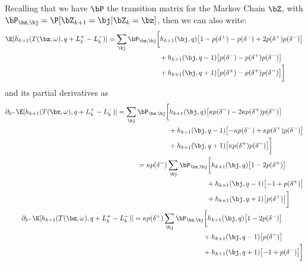 \documentclass[12pt]{article}
\begin{document}
Recalling that we have  $\bP$ the transition matrix for the Markov Chain $\bZ$, with $\bP_{\bz, \bj} = \P[\bZ_{k+1} = \bj | \bZ_k = \bz]$, then we can also write:
\begin{equation}
\begin{split}
\E[h_{k+1}(T(\bz,\omega), q + L_k^+ - L_k^- )] & = \sum_\bj \bP_{\bz,\bj} \biggl[ h_{k+1}(\bj, q) \bigl[ 1 - p(\delta^+) - p(\delta^-) + 2 p(\delta^+) p(\delta^-) \bigr]  \\
& \hphantom{\sum_\bj \bP_{\bz,\bj} \biggl[ {}+{}} + h_{k+1}(\bj, q-1) \bigl[ p(\delta^-)  - p(\delta^+) p(\delta^-) \bigr]   \\
& \hphantom{\sum_\bj \bP_{\bz,\bj} \biggl[ {}+{}} + h_{k+1}(\bj, q+1) \bigl[ p(\delta^+)  - p(\delta^+) p(\delta^-) \bigr] \biggr]
\end{split}
\end{equation}
and its partial derivatives as
\begin{align}
\begin{split}
\partial_{\delta^-} \E[h_{k+1}(T(\bz,\omega), q + L_k^+ - L_k^- )] & = 
\sum_\bj \bP_{\bz,\bj} \biggl[ h_{k+1}(\bj, q) \bigl[ \kappa p(\delta^-) - 2 \kappa p(\delta^+) p(\delta^-) \bigr]  \\
& \hphantom{\sum_\bj \bP_{\bz,\bj} \biggl[ {}+{}} + h_{k+1}(\bj, q-1) \bigl[ -\kappa p(\delta^-) + \kappa p(\delta^+) p(\delta^-) \bigr]   \\
& \hphantom{\sum_\bj \bP_{\bz,\bj} \biggl[ {}+{}} + h_{k+1}(\bj, q+1) \bigl[ \kappa p(\delta^+) p(\delta^-) \bigr] \biggr]
\end{split} \\
\begin{split}
& = \kappa p(\delta^-) \sum_\bj \bP_{\bz,\bj} \biggl[ h_{k+1}(\bj, q) \bigl[ 1 - 2 p(\delta^+) \bigr]  \\
& \hphantom{d(\delta^-) \sum_\bj \bP_{\bz,\bj} \biggl[ {}+{}} + h_{k+1}(\bj, q-1) \bigl[-1 + p(\delta^+) \bigr]   \\
& \hphantom{d(\delta^-) \sum_\bj \bP_{\bz,\bj} \biggl[ {}+{}} + h_{k+1}(\bj, q+1) \bigl[ p(\delta^+) \bigr] \biggr]
\end{split} \\
\begin{split}
\partial_{\delta^+} \E[h_{k+1}(T(\bz,\omega), q + L_k^+ - L_k^- )] & = 
\kappa p(\delta^+) \sum_\bj \bP_{\bz,\bj} \biggl[ h_{k+1}(\bj, q) \bigl[ 1 - 2 p(\delta^-) \bigr]  \\
& \hphantom{d(\delta^-) \sum_\bj \bP_{\bz,\bj} \biggl[ {}+{}} + h_{k+1}(\bj, q-1) \bigl[ p(\delta^-) \bigr]   \\
& \hphantom{d(\delta^-) \sum_\bj \bP_{\bz,\bj} \biggl[ {}+{}} + h_{k+1}(\bj, q+1) \bigl[ -1 + p(\delta^-) \bigr] \biggr]
\end{split}
\end{align}
\end{document}
